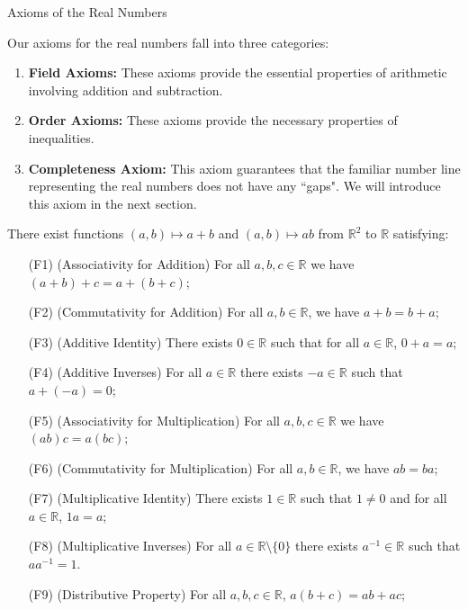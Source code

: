 \begin{section}{Axioms of the Real Numbers}\label{sec:AxiomsRealNumbers}

Our axioms for the real numbers fall into three categories:
\begin{enumerate}
\item \textbf{Field Axioms:} These axioms provide the essential properties of arithmetic involving addition and subtraction.
\item \textbf{Order Axioms:} These axioms provide the necessary properties of inequalities.
\item \textbf{Completeness Axiom:} This axiom guarantees that the familiar number line representing the real numbers does not have any ``gaps". We will introduce this axiom in the next section.
\end{enumerate}

\begin{fieldaxioms}\label{axiom:field axioms}
There exist functions $(a,b)\mapsto a+b$ and $(a,b)\mapsto ab$ from $\mathbb{R}^2$ to $\mathbb{R}$ satisfying:
\begin{enumerate}
\item[(F1)] (Associativity for Addition) For all $a, b, c\in \mathbb{R}$ we have $(a+b)+c = a+(b+c)$;
\item[(F2)] (Commutativity for Addition) For all $a,b\in \mathbb{R}$, we have $a+b=b+a$;
\item[(F3)] (Additive Identity) There exists $0\in\mathbb{R}$ such that for all $a\in\mathbb{R}$, $0+a=a$;
\item[(F4)] (Additive Inverses) For all $a\in\mathbb{R}$ there exists $-a\in\mathbb{R}$ such that $a+(-a)=0$;

\item[(F5)] (Associativity for Multiplication) For all $a, b, c\in \mathbb{R}$ we have $(ab)c = a(bc)$;
\item[(F6)] (Commutativity for Multiplication) For all $a,b\in \mathbb{R}$, we have $ab=ba$;
\item[(F7)] (Multiplicative Identity) There exists $1\in\mathbb{R}$ such that $1\neq 0$ and for all $a\in\mathbb{R}$, $1a=a$;
\item[(F8)] (Multiplicative Inverses) For all $a\in\mathbb{R}\setminus\{0\}$ there exists $a^{-1}\in\mathbb{R}$ such that $aa^{-1}=1$.
\item[(F9)] (Distributive Property) For all $a,b,c\in \mathbb{R}$, $a(b+c)=ab+ac$;
\end{enumerate}
\end{fieldaxioms}


\end{section}
